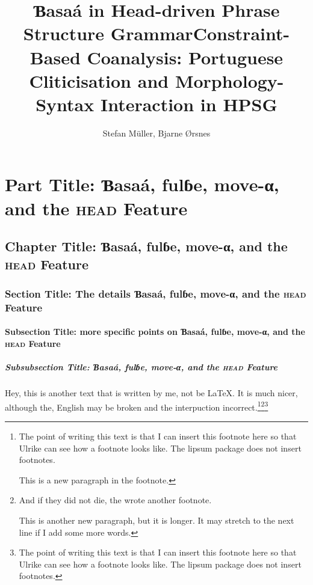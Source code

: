 \documentclass[ number=45
			   ,series=eotms
			   ,output=printondemand %
			  ]{langsci}
\title{Ɓasaá in \newlineCover Head-driven \newlineCover\newlineSpine Phrase Structure Grammar}
\title{Constraint-Based Coanalysis: Portuguese Cliticisation and Morphology-Syntax Interaction in HPSG}
\author{Stefan Müller, \newlineCover Bjarne Ørsnes}
\begin{document}
               
        
                                    
                           
\maketitle                

\tableofcontents      
        
\part{Part Title: Ɓasaá, fulɓe, move-α, and the \textsc{head} Feature}	               
\chapter{Chapter Title: Ɓasaá, fulɓe, move-α, and the \textsc{head} Feature}
\section{Section Title: The details Ɓasaá, fulɓe, move-α, and the \textsc{head} Feature}
\subsection{Subsection Title: more specific points on Ɓasaá, fulɓe, move-α, and the \textsc{head} Feature}
\subsubsection{Subsubsection Title: Ɓasaá, fulɓe, move-α, and the \textsc{head} Feature}       
                                                   

Hey, this is another text that is written by me, not be \LaTeX{}. It is much nicer, although the,
English may be broken and the interpuction incorrect.\footnote{%
  The point of writing this text is that I can insert this footnote here so that Ulrike can see how
  a footnote looks like. The lipsum package does not insert footnotes.

  This is a new paragraph in the footnote.
}\footnote{%
  And if they did not die, the wrote another footnote.

  This is another new paragraph, but it is longer. It may stretch to the next line if I add some
  more words.
}\footnote{%
  The point of writing this text is that I can insert this footnote here so that Ulrike can see how
  a footnote looks like. The lipsum package does not insert footnotes.
}
\end{document}
